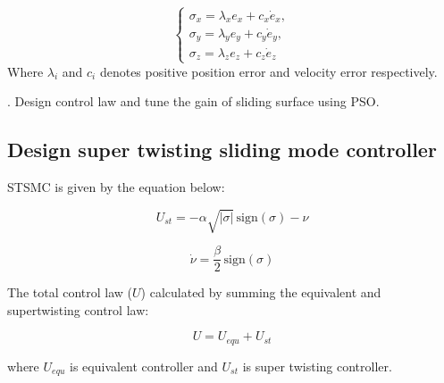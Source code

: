 \begin{small}
\begin{enumerate}



\begin{equation}
\begin{cases}
\sigma_x = \lambda_x e_x + c_x \dot{e}_x, \\
\sigma_y = \lambda_y e_y + c_y \dot{e}_y, \\
\sigma_z = \lambda_z e_z + c_z \dot{e}_z
\label{eq:position sliding manifold}
\end{cases}
\end{equation}
Where  $ \lambda_i $  and   $c_i$  denotes positive position error and velocity error respectively.

. Design control law and tune the gain of sliding surface using PSO.

\subsection*{Design super twisting sliding mode controller}
STSMC is given by the equation below:

\begin{equation}
U_{st} = -\alpha \sqrt{|\sigma|}\,\text{sign}(\sigma) - \nu
\label{eq:supertwisting for x axis}
\end{equation}

\begin{equation}
\dot{\nu} = \frac{\beta}{2}\,\text{sign}(\sigma)
\label{eq:v_x}
\end{equation}

The total control law ($U$) calculated by summing the equivalent and supertwisting control law:

\begin{equation}
U = U_{equ} + U_{st}
\label{eq:total control law}
\end{equation}

where $U_{equ}$ is equivalent controller and $U_{st}$ is super twisting controller. 


\end{enumerate}
\end{small}
